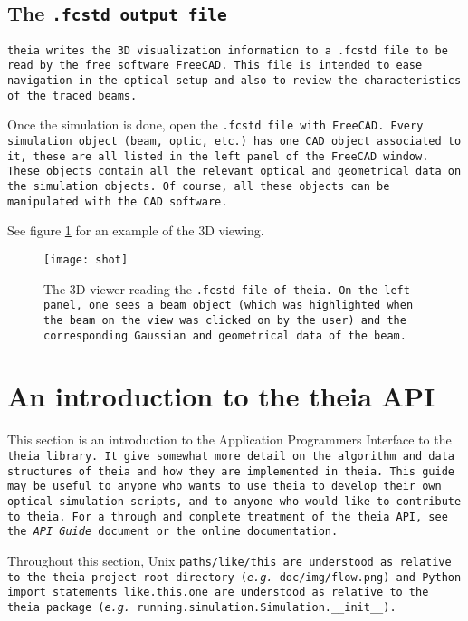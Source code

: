 \documentclass{article}
\begin{document}
\subsection{The \tt{.fcstd} output file}

\tt{theia} writes the 3D visualization information to a \tt{.fcstd} file to be read by the free software \tt{FreeCAD}. This file is intended to ease navigation in the optical setup and also to review the characteristics of the traced beams.

Once the simulation is done, open the \tt{.fcstd} file with \tt{FreeCAD}. Every simulation object (beam, optic, etc.) has one CAD object associated to it, these are all listed in the left panel of the \tt{FreeCAD} window. These objects contain all the relevant optical and geometrical data on the simulation objects. Of course, all these objects can be manipulated with the CAD software.

See figure \ref{shot} for an example of the 3D viewing.

\begin{figure}[h]
\begin{center}
\texttt{[image: shot]}
\end{center}
\caption{The 3D viewer reading the \tt{.fcstd} file of \tt{theia}. On the left panel, one sees a beam object (which was highlighted when the beam on the view was clicked on by the user) and the corresponding Gaussian and geometrical data of the beam.}
\label{shot}
\end{figure}


\newpage
\section{An introduction to the theia API}

This section is an introduction to the Application Programmers Interface to the \tt{theia} library. It give somewhat more detail on the algorithm and data structures of theia and how they are implemented in \tt{theia}. This guide may be useful to anyone who wants to use \tt{theia} to develop their own optical simulation scripts, and to anyone who would like to contribute to \tt{theia}. For a through and complete treatment of the \tt{theia} API, see the \textit{API Guide} document or the online documentation.

Throughout this section, Unix \tt{paths/like/this} are understood as relative to the theia project root directory (\textit{e.g.} \tt{doc/img/flow.png}) and Python import statements \tt{like.this.one} are understood as relative to the theia package (\textit{e.g.} \tt{running.simulation.Simulation.\_\_init\_\_}).
\end{document}

